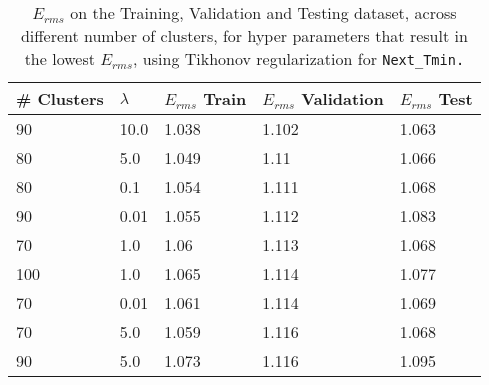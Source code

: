 \def\arraystretch{1.25}
\begin{table}[H]
\centering
\begin{tabular}{l l l l l}
\hline
\hline
\textbf{\# Clusters} & \textbf{$\lambda$} & \textbf{$E_{rms}$ Train} & \textbf{$E_{rms}$ Validation} & \textbf{$E_{rms}$ Test}\\
\hline
\hline
90 & 10.0 & 1.038 & 1.102 & 1.063\\
80 & 5.0 & 1.049 & 1.11 & 1.066\\
80 & 0.1 & 1.054 & 1.111 & 1.068\\
90 & 0.01 & 1.055 & 1.112 & 1.083\\
70 & 1.0 & 1.06 & 1.113 & 1.068\\
100 & 1.0 & 1.065 & 1.114 & 1.077\\
70 & 0.01 & 1.061 & 1.114 & 1.069\\
70 & 5.0 & 1.059 & 1.116 & 1.068\\
90 & 5.0 & 1.073 & 1.116 & 1.095\\
\hline
\end{tabular}
\caption{$E_{rms}$ on the Training, Validation and Testing dataset, across different number of clusters, for hyper parameters that result in the lowest $E_{rms}$, using Tikhonov regularization for \tt{Next\_Tmin}.}
\end{table}